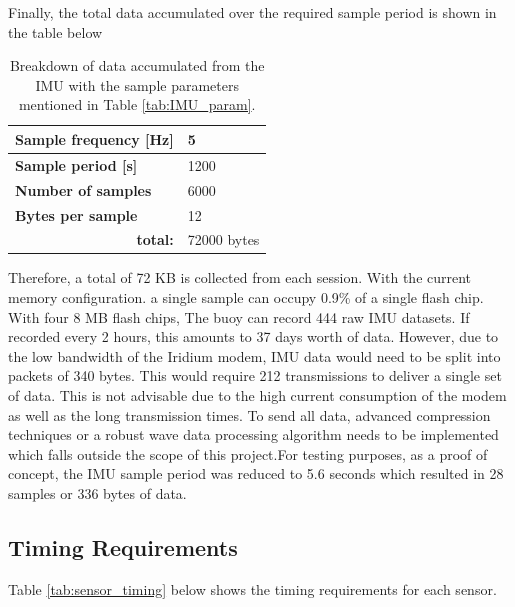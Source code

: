 Finally, the total data accumulated over the required sample period is shown in the table below

\begin{table}[H]
	\centering
	\caption{Breakdown of data accumulated from the IMU with the sample parameters mentioned in Table \ref{tab:IMU_param}.}
	\setlength{\extrarowheight}{5pt}
	\begin{tabular}{ll}
		\hline
		\textbf{Sample frequency [Hz] }    &  5\\
		\hline
		\textbf{Sample period [s]}       & 1200\\
		\hline
		\textbf{Number of samples}    & 6000 \\ 
		\hline
		\textbf{Bytes per sample}     & 12 \\
		\hline
		\multicolumn{1}{r}{\textbf{total:}} & \multicolumn{1}{l}{72000 bytes}\\
	\end{tabular}
	
	\label{tab:IMU_data_total}
\end{table}

Therefore, a total of 72 KB is collected from each session. With the current memory configuration. a single sample can occupy 0.9\% of a single flash chip. With four 8 MB flash chips, The buoy can record 444 raw IMU datasets. If recorded every 2 hours, this amounts to 37 days worth of data. However, due to the low bandwidth of the Iridium modem, IMU data would need to be split into packets of 340 bytes. This would require 212 transmissions to deliver a single set of data. This is not advisable due to the high current consumption of the modem as well as the long transmission times. To send all data, advanced compression techniques or a robust wave data processing algorithm needs to be implemented which falls outside the scope of this project.For testing purposes, as a proof of concept, the IMU sample period was reduced to 5.6 seconds which resulted in 28 samples or 336 bytes of data.

\subsection{Timing Requirements}



Table \ref{tab:sensor_timing} below shows the timing requirements for each sensor.

